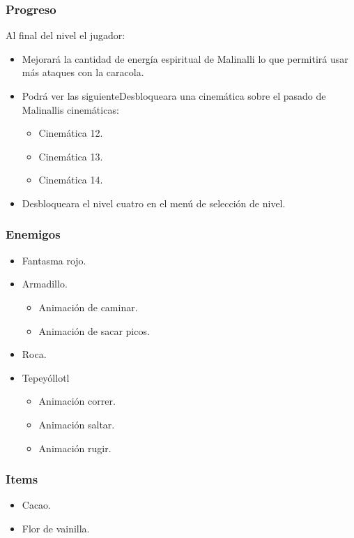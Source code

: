 \documentclass[11pt,letterpaper]{article}
\begin{document}
	\subsubsection{Progreso}
Al final del nivel el jugador:
\begin{itemize}
	\item Mejorará la cantidad de energía espiritual de Malinalli lo que permitirá usar más ataques con la caracola.
	\item Podrá ver las siguienteDesbloqueara una cinemática sobre el pasado de Malinallis cinemáticas: 
		\begin{itemize}
			\item Cinemática 12.
			\item Cinemática 13.
			\item Cinemática 14.
		\end{itemize}
	\item Desbloqueara el nivel cuatro en el menú de selección de nivel.
\end{itemize} 
	\subsubsection{Enemigos}
\begin{itemize}
	\item 	Fantasma rojo.
	\item Armadillo.
		\begin{itemize}
			\item Animación de caminar.
			\item Animación de sacar picos. 
		\end{itemize}
	\item Roca.
	\item Tepeyóllotl
		\begin{itemize}
			\item Animación correr.
			\item Animación saltar.
			\item Animación rugir.
		\end{itemize}
\end{itemize}
	\subsubsection{Items}
\begin{itemize}
	\item 	Cacao.
	\item	Flor de vainilla.
\end{itemize}
\end{document}
